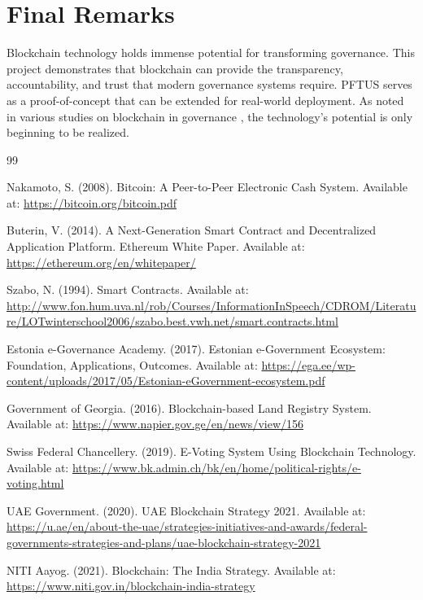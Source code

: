\documentclass[12pt,a4wide]{report}
\theoremstyle{plain}
\theoremstyle{definition}
\theoremstyle{remark}
\begin{document}
\section{Final Remarks}

Blockchain technology holds immense potential for transforming governance. This project demonstrates that blockchain can provide the transparency, accountability, and trust that modern governance systems require. PFTUS serves as a proof-of-concept that can be extended for real-world deployment. As noted in various studies on blockchain in governance \cite{blockchain-gov}, the technology's potential is only beginning to be realized.

\clearpage

\begin{thebibliography}{99}

Nakamoto, S. (2008). Bitcoin: A Peer-to-Peer Electronic Cash System. Available at: \url{https://bitcoin.org/bitcoin.pdf}

Buterin, V. (2014). A Next-Generation Smart Contract and Decentralized Application Platform. Ethereum White Paper. Available at: \url{https://ethereum.org/en/whitepaper/}

Szabo, N. (1994). Smart Contracts. Available at: \url{http://www.fon.hum.uva.nl/rob/Courses/InformationInSpeech/CDROM/Literature/LOTwinterschool2006/szabo.best.vwh.net/smart.contracts.html}

Estonia e-Governance Academy. (2017). Estonian e-Government Ecosystem: Foundation, Applications, Outcomes. Available at: \url{https://ega.ee/wp-content/uploads/2017/05/Estonian-eGovernment-ecosystem.pdf}

Government of Georgia. (2016). Blockchain-based Land Registry System. Available at: \url{https://www.napier.gov.ge/en/news/view/156}

Swiss Federal Chancellery. (2019). E-Voting System Using Blockchain Technology. Available at: \url{https://www.bk.admin.ch/bk/en/home/political-rights/e-voting.html}

UAE Government. (2020). UAE Blockchain Strategy 2021. Available at: \url{https://u.ae/en/about-the-uae/strategies-initiatives-and-awards/federal-governments-strategies-and-plans/uae-blockchain-strategy-2021}

NITI Aayog. (2021). Blockchain: The India Strategy. Available at: \url{https://www.niti.gov.in/blockchain-india-strategy}


\end{thebibliography}
\end{document}
